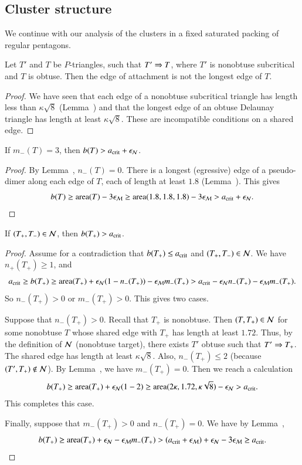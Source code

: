 \subsection{Cluster structure}

We continue with our analysis of the clusters in a fixed saturated
packing of regular pentagons.  

\begin{lemma}  
  Let $T'$ and $T$ be $P$-triangles, such that $T'\Rightarrow T$, where
  $T'$ is nonobtuse subcritical and $T$ is obtuse.  Then the edge
  of attachment is not the longest edge of $T$.
\end{lemma}

\begin{proof} We have seen that each edge of a nonobtuse subcritical
  triangle has length less than $\kappa\sqrt8$ (Lemma~) and that the longest
  edge of an obtuse Delaunay triangle has length at least
  $\kappa\sqrt{8}$.  These are incompatible conditions on a shared
  edge.
\end{proof}

\begin{lemma} 
If $m_-(T) = 3$, then $b(T) > a_\text{crit} + \epsilon_{\mathcal N}$.
\end{lemma}

\begin{proof} By Lemma~, $n_-(T)=0$.  There is a
  longest (egressive) edge of a pseudo-dimer along each edge of $T$,
  each of length at least $1.8$ (Lemma~).  This gives
\[
b(T) \ge {\operatorname{area}}(T) - 3\epsilon_{\mathcal M} 
\ge {\operatorname{area}}(1.8,1.8,1.8) - 3\epsilon_{\mathcal M} > a_\text{crit} + \epsilon_{\mathcal N}.
\]
\end{proof}

\begin{lemma}  
  If $(T_+,T_-)\in \mathcal N$, then $b(T_+)>a_\text{crit}$.
\end{lemma}

\begin{proof}  Assume for a contradiction that $b(T_+)\le a_\text{crit}$ and $(T_+,T_-)\in\mathcal N$. We have $n_+(T_+)\ge 1$, and
\[
a_\text{crit} \ge b(T_+) 
\ge {\operatorname{area}}(T_+) + \epsilon_{\mathcal N} (1 - n_-(T_+)) - \epsilon_{\mathcal M} m_-(T_+)
> a_\text{crit} - \epsilon_{\mathcal N} n_-(T_+) - \epsilon_{\mathcal M} m_-(T_+).
\]
So $n_-(T_+) > 0$ or $m_-(T_+)>0$. This gives two cases.  

Suppose that $n_-(T_+) >0$.  Recall that $T_+$ is nonobtuse.  Then
$(T,T_+)\in\mathcal N$ for some nonobtuse $T$ whose shared edge with $T_+$ has
length at least $1.72$.  Thus, by the definition of $\mathcal N$ (nonobtuse
target), there exists $T'$ obtuse such that $T'\Rightarrow T_+$.  The shared
edge has length at least $\kappa\sqrt8$.  Also, $n_-(T_+)\le 2$
(because $(T',T_+)\not\in \mathcal N$).  By Lemma~, we have
$m_-(T_+)=0$.  Then we reach a calculation
\[
b(T_+) \ge {\operatorname{area}}(T_+) + \epsilon_{\mathcal N} (1 - 2) 
\ge {\operatorname{area}} (2\kappa,1.72,\kappa\sqrt8) - \epsilon_{\mathcal N} > a_\text{crit}.
\]
This completes this case.

Finally, suppose that $m_-(T_+)>0$ and $n_-(T_+)=0$.  %
We have by Lemma~,
\[
b(T_+) \ge {\operatorname{area}}(T_+)+\epsilon_{\mathcal N} - \epsilon_{\mathcal M} m_-(T_+) 
> (a_\text{crit} + \epsilon_{\mathcal M}) + \epsilon_{\mathcal N} -3\epsilon_{\mathcal M}  \ge a_\text{crit}.
\]
\end{proof}

